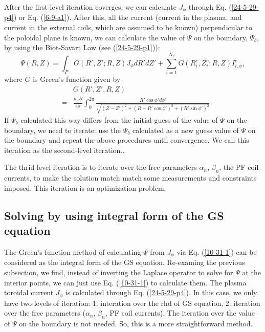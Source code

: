 \documentclass{llncs}
\begin{document}
After the first-level iteration coverges, we can calculate $J_{\phi}$ through
Eq. (\ref{24-5-29-p4}) or Eq. (\ref{6-9-a1}). After this, all the current
(current in the plasma, and current in the external coils, which are assumed
to be known) perpendicular to the poloidal plane is known, we can calculate
the value of $\Psi$ on the boundary, $\Psi_b$, by using the Biot-Savart Law
(see (\ref{24-5-29-p1})):
\begin{equation}
  \label{10-31-1} \Psi (R, Z) = \int_P G (R', Z' ; R, Z) J_{\phi} d R' d Z' +
  \sum_{i = 1}^{N_c} G (R^c_i, Z_i^c ; R, Z) I_{i, \phi}^c,
\end{equation}
where $G$ is Green's function given by
\begin{eqnarray}
  &  & G (R', Z', R, Z) \nonumber\\
  & = & \frac{\mu_0 R}{4 \pi} \int_0^{2 \pi} \frac{R' \cos \phi' d
  \phi'}{\sqrt{(Z - Z')^2 + (R - R' \cos \phi')^2 + (R' \sin \phi')^2}} 
  \label{24-5-29-p2}
\end{eqnarray}
If $\Psi_b$ calculated this way differs from the initial guess of the value of
$\Psi$ on the boundary, we need to iterate: use the $\Psi_b$ calculated as a
new guess value of $\Psi$ on the boundary and repeat the above procedures
until convergence. We call this iteration as the second-level
iteration.{\cite{lao1985efit}}.

The thrid level iteration is to iterate over the free parameters $\alpha_n$,
$\beta_n$, the PF coil currents, to make the solution match match some
measurements and constraints imposed. This iteration is an optimization
problem.

\subsection{Solving by using integral form of the GS equation}

The Green's function method of calculating $\Psi$ from $J_{\phi}$ via Eq.
(\ref{10-31-1}) can be considered as the integral form of the GS equation.
Re-examing the previous subsection, we find, instead of inverting the Laplace
operator to solve for $\Psi$ at the interior points, we can just use Eq.
(\ref{10-31-1}) to calculate them. The plasma toroidal current $J_{\phi}$ is
calculated through Eq. (\ref{24-5-29-p4}). In this case, we only have two
levels of iteration: 1. interation over the rhd of GS equation, 2. iteration
over the free parameters ($\alpha_n$, $\beta_n$, PF coil currents). The
iteration over the value of $\Psi$ on the boundary is not needed. So, this is
a more straightforward method.
\end{document}
